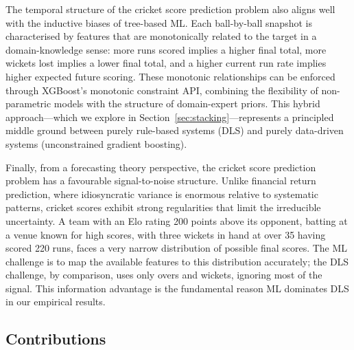 \documentclass[10pt,a4paper,twocolumn]{article}
\begin{document}
The temporal structure of the cricket score prediction problem also aligns well with the inductive biases of tree-based ML. Each ball-by-ball snapshot is characterised by features that are monotonically related to the target in a domain-knowledge sense: more runs scored implies a higher final total, more wickets lost implies a lower final total, and a higher current run rate implies higher expected future scoring. These monotonic relationships can be enforced through XGBoost's monotonic constraint API, combining the flexibility of non-parametric models with the structure of domain-expert priors. This hybrid approach---which we explore in Section~\ref{sec:stacking}---represents a principled middle ground between purely rule-based systems (DLS) and purely data-driven systems (unconstrained gradient boosting).

Finally, from a forecasting theory perspective, the cricket score prediction problem has a favourable signal-to-noise structure. Unlike financial return prediction, where idiosyncratic variance is enormous relative to systematic patterns, cricket scores exhibit strong regularities that limit the irreducible uncertainty. A team with an Elo rating 200 points above its opponent, batting at a venue known for high scores, with three wickets in hand at over 35 having scored 220 runs, faces a very narrow distribution of possible final scores. The ML challenge is to map the available features to this distribution accurately; the DLS challenge, by comparison, uses only overs and wickets, ignoring most of the signal. This information advantage is the fundamental reason ML dominates DLS in our empirical results.

\subsection{Contributions}
\end{document}
